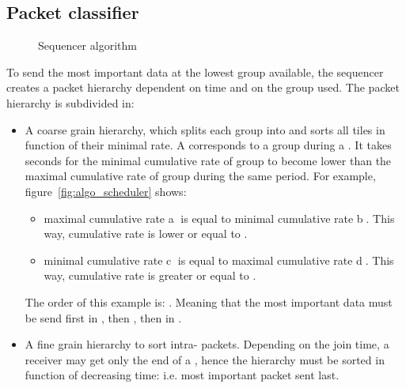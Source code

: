 \documentclass[a4paper]{article}
\begin{document}
    \subsection{Packet classifier}
        \begin{figure}
            \centering
            \caption{Sequencer algorithm}
        \end{figure}
        To send the most important data at the lowest group available, the
        sequencer creates a packet hierarchy dependent on time and on the group
        used. The packet hierarchy is subdivided in:
        \begin{itemize}
            \item{
                A coarse grain hierarchy, which splits each group into 
                    and sorts all tiles in function of their minimal rate. A
                     corresponds to a group during a .  It takes
                     seconds for the minimal cumulative rate of group
                     to become lower than the maximal cumulative rate of
                    group  during the same period. For example,
                          figure~\ref{fig:algo_scheduler} shows:
                    \begin{itemize}
                        \item{
                             maximal cumulative rate \textcircled{a} is
                                equal to  minimal cumulative rate
                                \textcircled{b}. This way,  cumulative
                                rate is lower or equal to .
                        }
                        \item{
                             minimal cumulative rate \textcircled{c} is
                                equal to  maximal cumulative rate
                                \textcircled{d}. This way,  cumulative
                                rate is greater or equal to .
                        }
                    \end{itemize}
                    The  order of this example is: . Meaning that the most important data must be
                        send first in , then , then in .
            }
            \item{
                A fine grain hierarchy to sort intra- packets.  Depending
                    on the join time, a receiver may get only the end of a
                    , hence the hierarchy must be sorted in function of
                    decreasing time: i.e. most important packet sent last.
            }
        \end{itemize}
\end{document}
